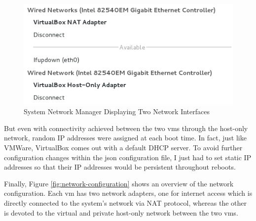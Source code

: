 \begin{figure}[ht]
    \centering
    \includegraphics[scale=0.65]{figures/vm-network-manager}
    \caption{System Network Manager Displaying Two Network Interfaces}
    \label{fig:vm-network-manager}
\end{figure}

But even with connectivity achieved between the two \glspl{vm} through the host-only network, random IP addresses were assigned at each boot time. In fact, just like VMWare, VirtualBox comes out with a default DHCP server. To avoid further configuration changes within the \gls{json} configuration file, I just had to set static IP addresses so that their IP addresses would be persistent throughout reboots.

Finally, Figure \ref{fig:network-configuration} shows an overview of the network configuration. Each \gls{vm} has two network adapters, one for internet access which is directly connected to the system's network via NAT protocol, whereas the other is devoted to the virtual and private host-only network between the two \glspl{vm}.

\vspace{0.5cm}

